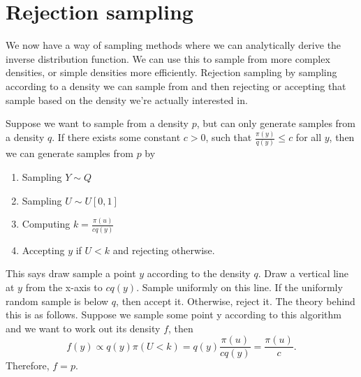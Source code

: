 \documentclass[
]{book}
\theoremstyle{definition}
\theoremstyle{definition}
\theoremstyle{definition}
\theoremstyle{definition}
\theoremstyle{remark}
\begin{document}
\hypertarget{rejection-sampling}{%
\section{Rejection sampling}\label{rejection-sampling}}

We now have a way of sampling methods where we can analytically derive the inverse distribution function. We can use this to sample from more complex densities, or simple densities more efficiently. Rejection sampling by sampling according to a density we can sample from and then rejecting or accepting that sample based on the density we're actually interested in.

Suppose we want to sample from a density \(p\), but can only generate samples from a density \(q\). If there exists some constant \(c > 0\), such that \(\frac{\pi(y)}{q(y)} \leq c\) for all \(y\), then we can generate samples from \(p\) by

\begin{enumerate}
\def\labelenumi{\arabic{enumi}.}
\item
  Sampling \(Y \sim Q\)
\item
  Sampling \(U \sim U[0, 1]\)
\item
  Computing \(k = \frac{\pi(u)}{cq(y)}\)
\item
  Accepting \(y\) if \(U < k\) and rejecting otherwise.
\end{enumerate}

This says draw sample a point \(y\) according to the density \(q\). Draw a vertical line at \(y\) from the x-axis to \(cq(y)\). Sample uniformly on this line. If the uniformly random sample is below \(q\), then accept it. Otherwise, reject it. The theory behind this is as follows. Suppose we sample some point y according to this algorithm and we want to work out its density \(f\), then
\[
f(y) \propto q(y)\pi(U < k) = q(y)\frac{\pi(u)}{cq(y)} = \frac{\pi(u)}{c}.
\]
Therefore, \(f = p\).
\end{document}
